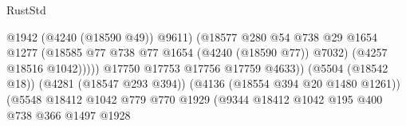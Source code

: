 \begin{lexlean}{RustStd}
\begin{coremodule}
                                                            @1942
                                                            (@4240 (@18590 @49))
                                                            @9611)
                                                          (@18577
                                                            @280
                                                            @54
                                                            @738
                                                            @29
                                                            @1654
                                                            @1277
                                                            (@18585
                                                              @77
                                                              @738
                                                              @77
                                                              @1654
                                                              (@4240 (@18590 @77))
                                                              @7032)
                                                            (@4257 @18516 @1042)))))
                                                    @17750
                                                    @17753
                                                    @17756
                                                    @17759
                                                    @4633))
                                                (@5504 (@18542 @18))
                                                (@4281 (@18547 @293 @394))
                                                (@4136 (@18554 @394 @20 @1480 @1261))
                                                (@5548
                                                  @18412
                                                  @1042
                                                  @779
                                                  @770
                                                  @1929
                                                  (@9344
                                                    @18412
                                                    @1042
                                                    @195
                                                    @400
                                                    @738
                                                    @366
                                                    @1497
                                                    @1928

\end{coremodule}
\end{lexlean}
